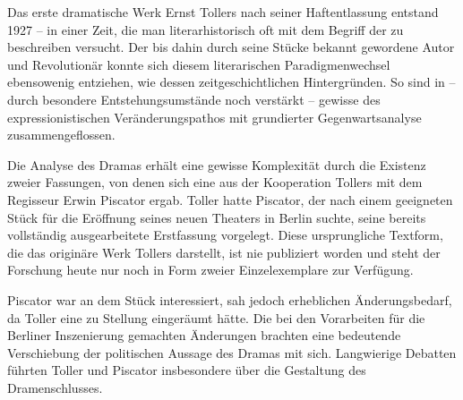 

Das erste dramatische Werk Ernst Tollers nach seiner Haftentlassung entstand
1927 -- in einer Zeit, die man literarhistorisch oft mit dem Begriff der
\Cite{Neuen Sachlichkeit} zu beschreiben versucht.  
Der bis dahin durch seine  Stücke bekannt
gewordene Autor und Revolutionär konnte sich diesem literarischen
Paradigmenwechsel ebensowenig entziehen, wie dessen zeitgeschichtlichen
Hintergründen. So sind in  -- durch besondere
Entstehungsumstände noch verstärkt -- gewisse  des
expressionistischen Veränderungspathos mit  grundierter
Gegenwartsanalyse zusammengeflossen.


Die Analyse des Dramas erhält eine gewisse Komplexität durch die Existenz
zweier Fassungen, von denen sich eine aus der Kooperation Tollers mit
dem Regisseur Erwin Piscator ergab. Toller hatte Piscator, der nach einem
geeigneten Stück für die Eröffnung seines neuen Theaters in Berlin
suchte, seine bereits vollständig ausgearbeitete Erstfassung
vorgelegt. Diese ursprungliche Textform, die das originäre Werk Tollers
darstellt, ist nie publiziert worden und steht der Forschung heute nur noch in
Form zweier Einzelexemplare zur Verfügung.

Piscator war an dem Stück interessiert, sah jedoch erheblichen
Änderungsbedarf, da Toller \Cite{dem Gefühl} eine zu \Cite{selbstherrliche}
Stellung eingeräumt hätte.  
Die bei den Vorarbeiten für die Berliner Inszenierung gemachten Änderungen
brachten eine bedeutende Verschiebung der politischen Aussage des Dramas mit
sich. Langwierige Debatten führten Toller und Piscator insbesondere über die
Gestaltung des Dramenschlusses.

